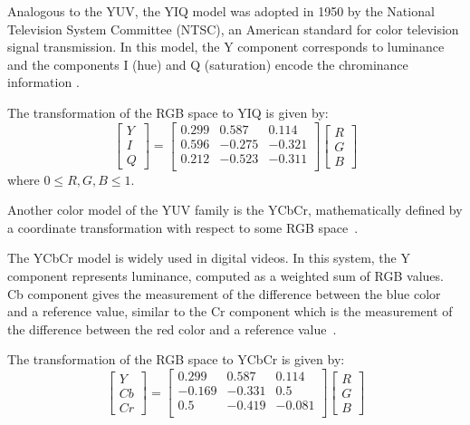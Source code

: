 Analogous to the YUV, the YIQ model was adopted in 1950 by the National Television System Committee (NTSC), an American standard for color television signal transmission. In this model, the Y component corresponds to luminance and the components I (hue) and Q (saturation) encode the chrominance information \citep{pedrini:08}.

The transformation of the RGB space to YIQ is given by:\\
\begin{equation}
  \begin{bmatrix}
    Y \\ I \\ Q
  \end{bmatrix} = 
  \begin{bmatrix}
    0.299  &  0.587 &  0.114 \\
    0.596  & -0.275 & -0.321 \\
    0.212  & -0.523 & -0.311 \\
  \end{bmatrix}
  \begin{bmatrix}
    R \\ G \\ B
  \end{bmatrix}
\end{equation}
where $0 \leq R, G, B \leq 1$.

Another color model of the YUV family is the YCbCr, mathematically defined by a coordinate transformation with respect to some RGB space~\citep{pedrini:08}.

The YCbCr model is widely used in digital videos. In this system, the Y component represents luminance, computed as a weighted sum of RGB values. Cb component gives the measurement of the difference between the blue color and a reference value, similar to the Cr component which is the measurement of the difference between the red color and a reference value~\citep{pedrini:08}.

The transformation of the RGB space to YCbCr is given by:\\
\begin{equation}
  \begin{bmatrix}
    Y \\ Cb \\ Cr
  \end{bmatrix} = 
  \begin{bmatrix}
     0.299 &  0.587 &  0.114 \\
    -0.169 & -0.331 &  0.5   \\
     0.5   & -0.419 & -0.081 \\
  \end{bmatrix}
  \begin{bmatrix}
    R \\ G \\ B
  \end{bmatrix}
\end{equation}


